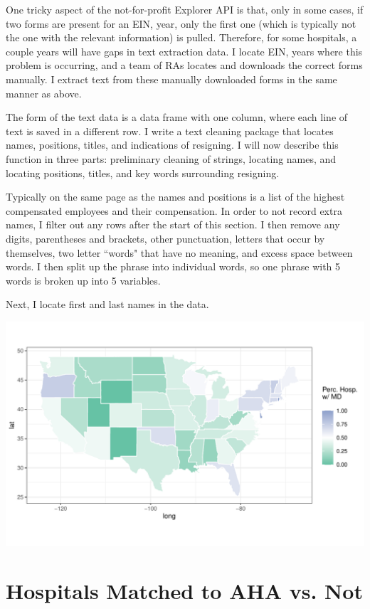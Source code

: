 \documentclass[12pt]{article}
\begin{document}
One tricky aspect of the not-for-profit Explorer API is that, only in some cases, if two forms are present for an EIN, year, only the first one (which is typically not the one with the relevant information) is pulled. Therefore, for some hospitals, a couple years will have gaps in text extraction data. I locate EIN, years where this problem is occurring, and a team of RAs locates and downloads the correct forms manually. I extract text from these manually downloaded forms in the same manner as above. 

The form of the text data is a data frame with one column, where each line of text is saved in a different row. I write a text cleaning package that locates names, positions, titles, and indications of resigning. I will now describe this function in three parts: preliminary cleaning of strings, locating names, and locating positions, titles, and key words surrounding resigning. 

Typically on the same page as the names and positions is a list of the highest compensated employees and their compensation. In order to not record extra names, I filter out any rows after the start of this section. I then remove any digits, parentheses and brackets, other punctuation, letters that occur by themselves, two letter ``words" that have no meaning, and excess space between words. I then split up the phrase into individual words, so one phrase with 5 words is broken up into 5 variables. 

Next, I locate first and last names in the data. 

\includegraphics[width=\textwidth]{Objects/has_doc_avg_map.pdf}


\section{Hospitals Matched to AHA vs. Not}\label{app:matched}
\end{document}
